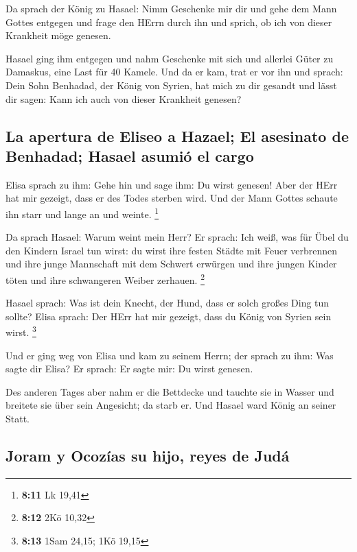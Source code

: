  Da sprach der König zu Hasael: Nimm Geschenke mir dir und
gehe dem Mann Gottes entgegen und frage den HErrn durch ihn und sprich,
ob ich von dieser Krankheit möge genesen.

 Hasael ging ihm entgegen und nahm Geschenke mit sich und
allerlei Güter zu Damaskus, eine Last für 40 Kamele. Und da er kam, trat
er vor ihn und sprach: Dein Sohn Benhadad, der König von Syrien, hat
mich zu dir gesandt und lässt dir sagen: Kann ich auch von dieser
Krankheit genesen?

\hypertarget{la-apertura-de-eliseo-a-hazael-el-asesinato-de-benhadad-hasael-asumiuxf3-el-cargo}{%
\subsection{La apertura de Eliseo a Hazael; El asesinato de Benhadad;
Hasael asumió el
cargo}\label{la-apertura-de-eliseo-a-hazael-el-asesinato-de-benhadad-hasael-asumiuxf3-el-cargo}}

 Elisa sprach zu ihm: Gehe hin und sage ihm: Du wirst
genesen! Aber der HErr hat mir gezeigt, dass er des Todes sterben wird.
 Und der Mann Gottes schaute ihn starr und lange an und
weinte. \footnote{\textbf{8:11} Lk 19,41}

 Da sprach Hasael: Warum weint mein Herr? Er sprach: Ich
weiß, was für Übel du den Kindern Israel tun wirst: du wirst ihre festen
Städte mit Feuer verbrennen und ihre junge Mannschaft mit dem Schwert
erwürgen und ihre jungen Kinder töten und ihre schwangeren Weiber
zerhauen. \footnote{\textbf{8:12} 2Kö 10,32}

 Hasael sprach: Was ist dein Knecht, der Hund, dass er
solch großes Ding tun sollte? Elisa sprach: Der HErr hat mir gezeigt,
dass du König von Syrien sein wirst. \footnote{\textbf{8:13} 1Sam 24,15;
  1Kö 19,15}

 Und er ging weg von Elisa und kam zu seinem Herrn; der
sprach zu ihm: Was sagte dir Elisa? Er sprach: Er sagte mir: Du wirst
genesen.

 Des anderen Tages aber nahm er die Bettdecke und tauchte
sie in Wasser und breitete sie über sein Angesicht; da starb er. Und
Hasael ward König an seiner Statt.

\hypertarget{joram-y-ocozuxedas-su-hijo-reyes-de-juduxe1}{%
\subsection{Joram y Ocozías su hijo, reyes de
Judá}\label{joram-y-ocozuxedas-su-hijo-reyes-de-juduxe1}}

